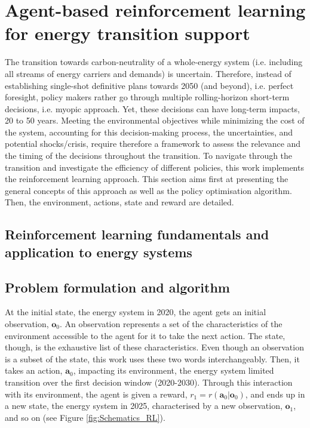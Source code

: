 \section{Agent-based reinforcement learning for energy transition support}
\label{sec:meth:RL}


The transition towards carbon-neutrality of a whole-energy system (i.e. including all streams of energy carriers and demands) is uncertain. Therefore, instead of establishing single-shot definitive plans towards 2050 (and beyond), i.e. perfect foresight, policy makers rather go through multiple rolling-horizon short-term decisions, i.e. myopic approach. Yet, these decisions can have long-term impacts, 20 to 50 years. Meeting the environmental objectives while minimizing the cost of the system, accounting for this decision-making process, the uncertainties, and potential shocks/crisis, require therefore a framework to assess the relevance and the timing of the decisions throughout the transition. To navigate through the transition and investigate the efficiency of different policies, this work implements the reinforcement learning approach. This section aims first at presenting the general concepts of this approach as well as the policy optimisation algorithm. Then, the environment, actions, state and reward are detailed.

\subsection{Reinforcement learning fundamentals and application to energy systems}
\label{subsec:meth_RL_fundamentals}



\subsection{Problem formulation and algorithm}
\label{subsec:meth_RL_algo}
At the initial state, \ie the energy system in 2020, the agent gets an initial observation, $\bm{o}_0$. An observation represents a set of the characteristics of the environment accessible to the agent for it to take the next action. The state, though, is the exhaustive list of these characteristics. Even though an observation is a subset of the state, this work uses these two words interchangeably. Then, it takes an action, $\bm{a}_0$, impacting its environment, \ie the energy system limited transition over the first decision window (2020-2030). Through this interaction with its environment, the agent is given a reward, $r_1=r\left(\bm{a}_0 | \bm{o}_0 \right)$, and ends up in a new state, \ie the energy system in 2025, characterised by a new observation, $\bm{o}_1$, and so on (see Figure \ref{fig:Schematics_RL}).


